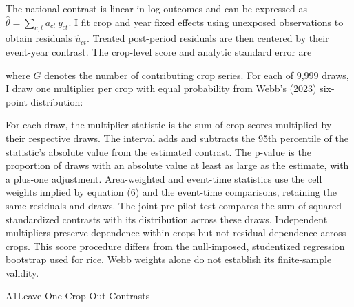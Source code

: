 
The national contrast is linear in log outcomes and can be expressed as \(\widehat{\theta} = \sum_{c,t}^{}a_{ct}\, y_{ct}\). I fit crop and year fixed effects using unexposed observations to obtain residuals \({\widehat{u}}_{ct}\). Treated post-period residuals are then centered by their event-year contrast. The crop-level score and analytic standard error are


where \(G\) denotes the number of contributing crop series. For each of 9,999 draws, I draw one multiplier per crop with equal probability from Webb's (2023) six-point distribution:


For each draw, the multiplier statistic is the sum of crop scores multiplied by their respective draws. The interval adds and subtracts the 95th percentile of the statistic's absolute value from the estimated contrast. The p-value is the proportion of draws with an absolute value at least as large as the estimate, with a plus-one adjustment. Area-weighted and event-time statistics use the cell weights implied by equation (6) and the event-time comparisons, retaining the same residuals and draws. The joint pre-pilot test compares the sum of squared standardized contrasts with its distribution across these draws. Independent multipliers preserve dependence within crops but not residual dependence across crops. This score procedure differs from the null-imposed, studentized regression bootstrap used for rice. Webb weights alone do not establish its finite-sample validity.

\begin{wordtable}{A1}{Leave-One-Crop-Out Contrasts}

\end{wordtable}
